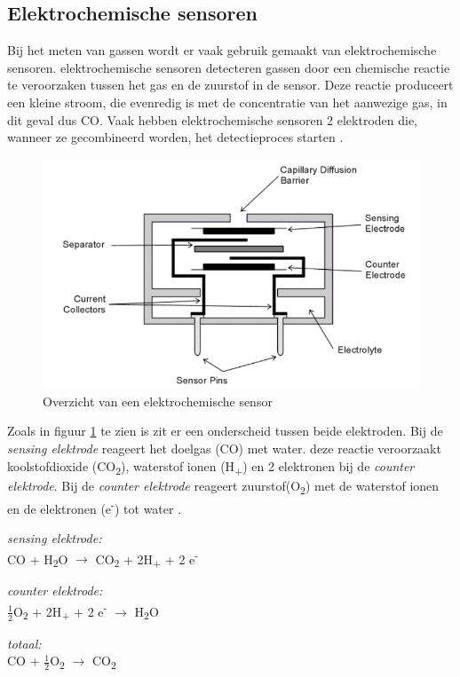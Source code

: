 \documentclass[a4paper, 11pt]{article} %
\begin{document}
	\subsection{Elektrochemische sensoren} \label{subsec::elektrochemische_sensoren}
	Bij het meten van gassen wordt er vaak gebruik gemaakt van elektrochemische sensoren. elektrochemische sensoren detecteren gassen door een chemische reactie te veroorzaken tussen het gas en de zuurstof in de sensor. Deze reactie produceert een kleine stroom, die evenredig is met de concentratie van het aanwezige gas, in dit geval dus CO. Vaak hebben elektrochemische sensoren 2 elektroden die, wanneer ze gecombineerd worden, het detectieproces starten \cite{SGX Intro}.
	\begin{figure}[h!]
		\centering
		\includegraphics[width=.6\linewidth]{afbeeldingen/EC_sensor.png}
		\caption{Overzicht van een elektrochemische sensor \cite{SGX Intro}}
		\label{fig:EC_sensor}
	\end{figure}
	Zoals in figuur \ref{fig:EC_sensor} te zien is zit er een onderscheid tussen beide elektroden. Bij de \textit{sensing elektrode} reageert het doelgas (CO) met water. deze reactie veroorzaakt koolstofdioxide (CO\textsubscript{2}), waterstof ionen (H\textsubscript{+}) en 2 elektronen bij de \textit{counter elektrode}. Bij de \textit{counter elektrode} reageert zuurstof(O\textsubscript{2}) met de waterstof ionen en de elektronen (e\textsuperscript{-}) tot water \cite{SGX Intro}.
	\begin{center}
		\textit{sensing elektrode:}\\
		CO + H\textsubscript{2}O $\rightarrow$ CO\textsubscript{2} + 2H\textsubscript{+} + 2 e\textsuperscript{-} 
		\bigskip
		
		\textit{counter elektrode:}\\
		$\frac{1}{2}$O\textsubscript{2} + 2H\textsubscript{+} + 2 e\textsuperscript{-} $\rightarrow$ H\textsubscript{2}O
		\bigskip
		
		\textit{totaal:}\\
		CO + $\frac{1}{2}$O\textsubscript{2} $\rightarrow$ CO\textsubscript{2}	
	\end{center}
\end{document}
